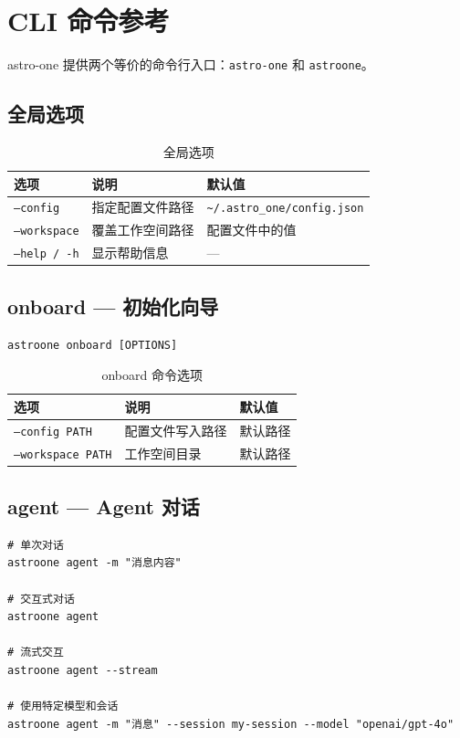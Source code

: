 \documentclass[12pt,a4paper,UTF8]{ctexart}
\begin{document}
\chapter{CLI 命令参考}

astro-one 提供两个等价的命令行入口：\texttt{astro-one} 和 \texttt{astroone}。

\section{全局选项}

\begin{table}[H]
\centering
\begin{tabular}{L{3cm} L{8cm} L{4cm}}
\toprule
\textbf{选项} & \textbf{说明} & \textbf{默认值} \\
\midrule
\texttt{--config} & 指定配置文件路径 & \texttt{\textasciitilde/.astro\_one/config.json} \\
\texttt{--workspace} & 覆盖工作空间路径 & 配置文件中的值 \\
\texttt{--help / -h} & 显示帮助信息 & — \\
\bottomrule
\end{tabular}
\caption{全局选项}
\end{table}

\section{onboard — 初始化向导}

\begin{verbatim}
astroone onboard [OPTIONS]
\end{verbatim}

\begin{table}[H]
\centering
\begin{tabular}{L{4cm} L{8cm} L{3cm}}
\toprule
\textbf{选项} & \textbf{说明} & \textbf{默认值} \\
\midrule
\texttt{--config PATH} & 配置文件写入路径 & 默认路径 \\
\texttt{--workspace PATH} & 工作空间目录 & 默认路径 \\
\bottomrule
\end{tabular}
\caption{onboard 命令选项}
\end{table}

\section{agent — Agent 对话}

\begin{verbatim}
# 单次对话
astroone agent -m "消息内容"

# 交互式对话
astroone agent

# 流式交互
astroone agent --stream

# 使用特定模型和会话
astroone agent -m "消息" --session my-session --model "openai/gpt-4o"
\end{verbatim}
\end{document}
